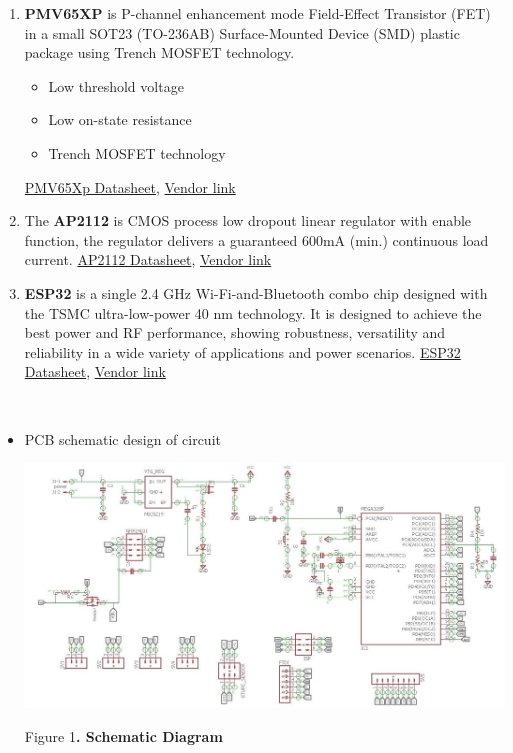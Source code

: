 \documentclass[a4paper,12pt,oneside]{book}
\begin{document}
\begin{itemize}
\begin{enumerate}
\item \textbf{PMV65XP} is P-channel enhancement mode Field-Effect Transistor (FET) in a small SOT23
(TO-236AB) Surface-Mounted Device (SMD) plastic package using Trench MOSFET
technology.
\begin{itemize}
\item Low threshold voltage 
\item Low on-state resistance
\item Trench MOSFET technology
\end{itemize}
\href{https://assets.nexperia.com/documents/data-sheet/PMV65XP.pdf}{PMV65Xp Datasheet},
  \href{https://www.digikey.in/product-detail/en/nexperia-usa-inc/PMV65XP215/1727-3124-1-ND/949693}{Vendor link}     


\item  The  \textbf{AP2112}  is  CMOS  process  low  dropout  linear  regulator  with 
enable  function,  the  regulator  delivers  a  guaranteed  600mA  (min.) 
continuous load current. 
        \href{https://www.diodes.com/assets/Datasheets/AP2112.pdf}{AP2112 Datasheet},
        \href{https://www.mouser.in/Search/Refine.aspx?Keyword=AP2112}
        {Vendor link} 
        \item \textbf{ESP32} is a single 2.4 GHz Wi-Fi-and-Bluetooth combo chip designed with the TSMC ultra-low-power 40 nm
technology. It is designed to achieve the best power and RF performance, showing robustness, versatility and
reliability in a wide variety of applications and power scenarios. \href{https://www.espressif.com/sites/default/files/documentation/esp32_datasheet_en.pdf}{ESP32 Datasheet}, \href{https://robokits.co.in/iot-internet-of-things/esp32-development-board-wifi-bluetooth?gclid=CjwKCAjwj4zaBRABEiwA0xwsPzdTv88ACYXS8xP16QkXnavkAI1VsyFrMKXILtADRV6BI9Ox5uXtXxoCw5MQAvD_BwE&zenid=2e2v1a2o33svqkk9gdknbbgbt5}
        {Vendor link} 
 

        
        \end{enumerate}
  \end{itemize}
  \begin{itemize}
   \item PCB schematic design of circuit
         
   \includegraphics[width=1\textwidth]{eagle_sch_snap.JPG}\\
         \begin{center}
         \small{Figure 1\textbf{. Schematic Diagram}}
\end{center}
  
\end{itemize}
\end{document}
